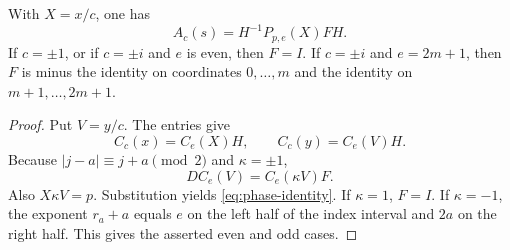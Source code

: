 \begin{lemma}\label{lem:phase-identity}
With \(X=x/c\), one has
\begin{equation}\label{eq:phase-identity}
 A_c(s)=H^{-1}P_{p,e}(X)F H.
\end{equation}
If \(c=\pm1\), or if \(c=\pm i\) and \(e\) is even, then \(F=I\).
If \(c=\pm i\) and \(e=2m+1\), then \(F\) is minus the identity
on coordinates \(0,\ldots,m\) and the identity on
\(m+1,\ldots,2m+1\).
\end{lemma}
\begin{proof}
Put \(V=y/c\). The entries give
\[
 C_c(x)=C_e(X)H,\qquad C_c(y)=C_e(V)H.
\]
Because \(|j-a|\equiv j+a\pmod2\) and \(\kappa=\pm1\),
\[
 DC_e(V)=C_e(\kappa V)F.
\]
Also \(X\kappa V=p\). Substitution yields
\eqref{eq:phase-identity}.
If \(\kappa=1\), \(F=I\). If \(\kappa=-1\), the exponent
\(r_a+a\) equals \(e\) on the left half of the index interval
and \(2a\) on the right half. This gives the asserted even
and odd cases.
\end{proof}

